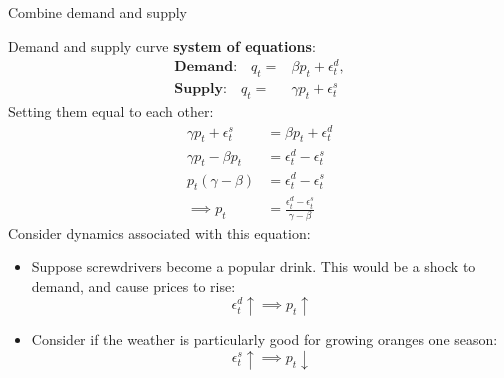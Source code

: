 \documentclass[compress, 8pt]{beamer}
\begin{document}
\begin{frame}{Combine demand and supply}

Demand and supply curve \textbf{system of equations}: 
\begin{align*}
    \textbf{Demand:} \quad q_t =& \beta p_t + \epsilon_t^d, \\
    \textbf{Supply:} \quad q_t =& \gamma p_t + \epsilon_t^s
\end{align*}
Setting them equal to each other:
\begin{align*}
     \gamma p_t + \epsilon_t^s &= \beta p_t + \epsilon_t^d\\
    \gamma p_t - \beta p_t &= \epsilon_t^d - \epsilon_t^s \\
    p_t (\gamma - \beta) &= \epsilon_t^d - \epsilon_t^s \\
    \implies p_t &= \frac{\epsilon_t^d - \epsilon_t^s}{\gamma - \beta}
\end{align*}
Consider dynamics associated with this equation:
\begin{itemize}
    \item Suppose screwdrivers become a popular drink. This would be a shock to demand, and cause prices to rise:
    \begin{equation*}
        \epsilon_t^d \uparrow \implies p_t \uparrow
    \end{equation*}
    \item Consider if the weather is particularly good for growing oranges one season:
    \begin{equation*}
        \epsilon_t^s \uparrow \implies p_t \downarrow
    \end{equation*}

\end{itemize}

\end{frame}
\end{document}
